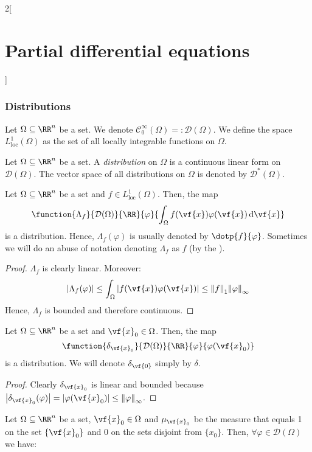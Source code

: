 \documentclass[../../../main_math.tex]{subfiles}
\begin{document}
\begin{multicols}{2}[\section{Partial differential equations}]
  \subsubsection{Distributions}
  \begin{definition}
    Let $\Omega\subseteq \RR^n$ be a set. We denote $\mathcal{C}_0^\infty(\Omega)=:\mathcal{D}(\Omega)$. We define the space $L_{\mathrm{loc}}^1(\Omega)$ as the set of all locally integrable functions on $\Omega$.
  \end{definition}
  \begin{definition}[Distribution]
    Let $\Omega\subseteq \RR^n$ be a set. A \emph{distribution} on $\Omega$ is a continuous linear form on $\mathcal{D}(\Omega)$. The vector space of all distributions on $\Omega$ is denoted by $\mathcal{D}^*(\Omega)$.
  \end{definition}
  \begin{proposition}
    Let $\Omega\subseteq \RR^n$ be a set and $f\in L_{\mathrm{loc}}^1(\Omega)$. Then, the map
    $$
      \function{\Lambda_f}{\mathcal{D}(\Omega)}{\RR}{\varphi}{\displaystyle\int_\Omega f(\vf{x})\varphi(\vf{x})\dd{\vf{x}}}
    $$
    is a distribution. Hence, $\Lambda_f(\varphi)$ is usually denoted by $\dotp{f}{\varphi}$. Sometimes we will do an abuse of notation denoting $\Lambda_f$ as $f$ (by the ).
  \end{proposition}
  \begin{proof}
    $\Lambda_f$ is clearly linear. Moreover: $$\abs{\Lambda_f(\varphi)}\leq\int_\Omega\abs{f(\vf{x})\varphi(\vf{x})}\leq \norm{f}_1\norm{\varphi}_\infty$$
    Hence, $\Lambda_f$ is bounded and therefore continuous.
  \end{proof}
  \begin{proposition}
    Let $\Omega\subseteq \RR^n$ be a set and $\vf{x}_0\in\Omega$. Then, the map
    $$
      \function{\delta_{\vf{x}_0}}{\mathcal{D}(\Omega)}{\RR}{\varphi}{\varphi(\vf{x}_0)}
    $$
    is a distribution. We will denote $\delta_{\vf{0}}$ simply by $\delta$.
  \end{proposition}
  \begin{proof}
    Clearly $\delta_{\vf{x}_0}$ is linear and bounded because $\abs{\delta_{\vf{x}_0}(\varphi)}=\abs{\varphi(\vf{x}_0)}\leq \norm{\varphi}_\infty$.
  \end{proof}
  \begin{lemma}
    Let $\Omega\subseteq \RR^n$ be a set, $\vf{x}_0\in\Omega$ and $\mu_{\vf{x}_0}$ be the measure that equals 1 on the set $\{\vf{x}_0\}$ and $0$ on the sets disjoint from $\{x_0\}$. Then, $\forall\varphi\in\mathcal{D}(\Omega)$ we have:

\end{lemma}
\end{multicols}
\end{document}
